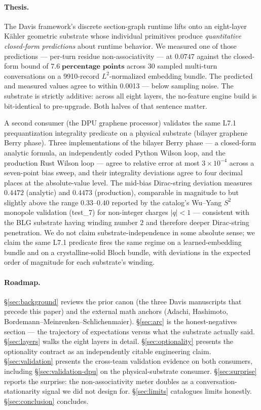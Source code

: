 \documentclass[11pt,letterpaper]{article}
\begin{document}
\paragraph{Thesis.} The Davis framework's discrete section-graph
runtime lifts onto an eight-layer K\"ahler geometric substrate whose
individual primitives produce \emph{quantitative closed-form
predictions} about runtime behavior. We measured one of those
predictions --- per-turn residue non-associativity --- at
$\mathbf{0.0747}$ against the closed-form bound of
$\mathbf{7.6\;\text{percentage points}}$ across 30 sampled multi-turn
conversations on a 9910-record $L^2$-normalized embedding bundle.
The predicted and measured values agree to within 0.0013 --- below
sampling noise. The substrate is strictly additive: across all eight
layers, the no-feature engine build is bit-identical to pre-upgrade.
Both halves of that sentence matter.

A second consumer (the DPU graphene processor) validates the same
L7.1 prequantization integrality predicate on a physical substrate
(bilayer graphene Berry phase). Three implementations of the bilayer
Berry phase --- a closed-form analytic formula, an independently
coded Python Wilson loop, and the production Rust Wilson loop ---
agree to relative error at most $3 \times 10^{-4}$ across a
seven-point bias sweep, and their integrality deviations agree to
four decimal places at the absolute-value level. The mid-bias
Dirac-string deviation measures $0.4472$ (analytic) and $0.4473$
(production), comparable in magnitude to but slightly above the
range $0.33$--$0.40$ reported by the catalog's Wu--Yang $S^2$
monopole validation (test\_7) for non-integer charges $|q| < 1$ ---
consistent with the BLG substrate having winding number $2$ and
therefore deeper Dirac-string penetration. We do not claim
substrate-independence in some absolute sense; we claim the same
L7.1 predicate fires the same regime on a learned-embedding bundle
and on a crystalline-solid Bloch bundle, with deviations in the
expected order of magnitude for each substrate's winding.

\paragraph{Roadmap.}
\S\ref{sec:background} reviews the prior canon (the three Davis
manuscripts that precede this paper) and the external math anchors
(Adachi, Hashimoto, Bordemann--Meinrenken--Schlichenmaier).
\S\ref{sec:arc} is the honest-negatives section --- the trajectory of
expectations versus what the substrate actually said.
\S\ref{sec:layers} walks the eight layers in detail.
\S\ref{sec:optionality} presents the
optionality contract as an independently citable engineering claim.
\S\ref{sec:validation} presents the cross-team validation evidence on
both consumers, including \S\ref{sec:validation-dpu} on the
physical-substrate consumer. \S\ref{sec:surprise} reports the
surprise: the non-associativity meter doubles as a
conversation-stationarity signal we did not design for.
\S\ref{sec:limits} catalogues limits honestly.
\S\ref{sec:conclusion} concludes.
\end{document}
